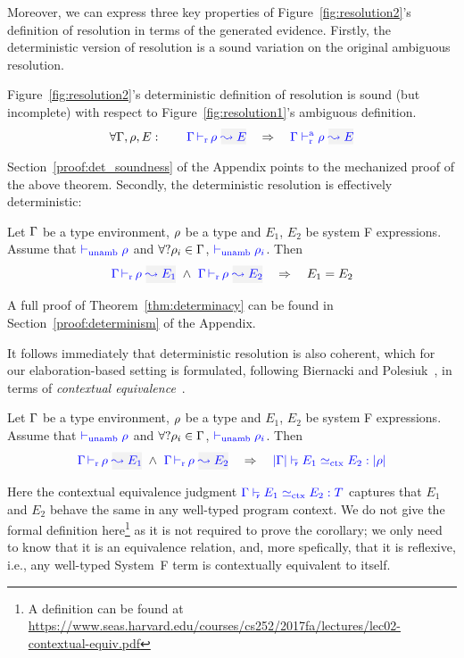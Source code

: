 Moreover, we can express three key properties of Figure~\ref{fig:resolution2}'s
definition of resolution in terms of the generated evidence.
Firstly, the deterministic version of resolution is a sound variation on the original ambiguous resolution.
\begin{theorem}[Soundness]
Figure~\ref{fig:resolution2}'s deterministic definition of resolution is sound (but
incomplete) with respect to Figure~\ref{fig:resolution1}'s ambiguous definition.
\[\forall \tenv, \rulet, E: \quad\quad \dres{\tenv}{\rulet}{E} \quad\Rightarrow\quad \ares{\tenv}{\rulet}{E} \]
\end{theorem}
Section~\ref{proof:det_soundness} of the Appendix points to the mechanized proof of the above
theorem.
Secondly, the deterministic resolution is effectively deterministic:
\begin{theorem}[Determinacy]\label{thm:determinacy}
Let $\Gamma$ be a type environment, $\rho$ be a type and $E_1$, $E_2$ be system F expressions.
Assume that ${\color{blue}  \vdash_{\mathrm{unamb}} \rho}$ and $\forall ?\rho_i\in\Gamma$, ${\color{blue}  \vdash_{\mathrm{unamb}} \rho_i}$. Then
\[ %
     \dres{\tenv}{\rulet}{E_1} ~\wedge~ 
     \dres{\tenv}{\rulet}{E_2} \quad\Rightarrow\quad E_1 = E_2 \]
\end{theorem}
A full proof of Theorem~\ref{thm:determinacy} can be found in
Section~\ref{proof:determinism} of the Appendix.

It follows immediately that deterministic resolution is also coherent,
which for our elaboration-based setting is formulated, following Biernacki and Polesiuk~, in
terms of \emph{contextual equivalence}~\cite{morris}.
\begin{corollary}[Coherence]\label{lem:coherence}
Let $\Gamma$ be a type environment, $\rho$ be a type and $E_1$, $E_2$ be system F expressions.
Assume that ${\color{blue}  \vdash_{\mathrm{unamb}} \rho}$ and $\forall ?\rho_i\in\Gamma$, ${\color{blue}  \vdash_{\mathrm{unamb}} \rho_i}$. Then
\[ %
     \dres{\tenv}{\rulet}{E_1} ~\wedge~ 
     \dres{\tenv}{\rulet}{E_2} \quad\Rightarrow\quad 
     \fctx{\etrans{\tenv}}{E_1}{E_2}{\ttrans[\rulet]} \]
\end{corollary}
Here the contextual equivalence judgment ${\color{blue} \Gamma \vdash_{\scriptscriptstyle \hspace{-1mm}\mathtt{F}} E_1 \simeq_{\rm ctx} E_2 : T}$ captures
that $E_1$ and $E_2$ behave the same in any well-typed program context. We do
not give the formal definition here\footnote{A definition can be found at \url{https://www.seas.harvard.edu/courses/cs252/2017fa/lectures/lec02-contextual-equiv.pdf}} as it is not required to prove the
corollary; we only need to know that it is an equivalence relation, and, more
spefically, that it is reflexive, i.e., any well-typed System~F term is
contextually equivalent to itself. 

